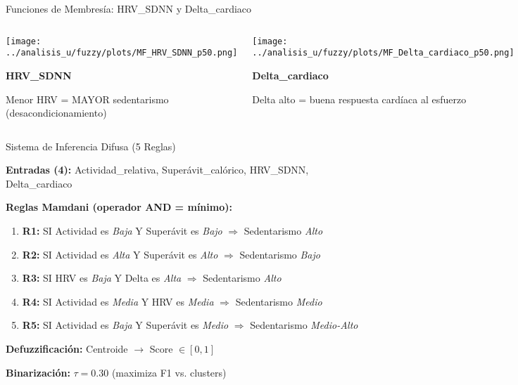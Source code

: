 \documentclass[aspectratio=169]{beamer}
\begin{document}
\begin{frame}{Funciones de Membresía: HRV\_SDNN y Delta\_cardiaco}

\begin{columns}[T]
\begin{center}
\texttt{[image: ../analisis\_u/fuzzy/plots/MF\_HRV\_SDNN\_p50.png]}

\textbf{HRV\_SDNN}

Menor HRV = MAYOR sedentarismo (desacondicionamiento)
\end{center}

\begin{center}
\texttt{[image: ../analisis\_u/fuzzy/plots/MF\_Delta\_cardiaco\_p50.png]}

\textbf{Delta\_cardiaco}

Delta alto = buena respuesta cardíaca al esfuerzo
\end{center}
\end{columns}

\end{frame}


\begin{frame}{Sistema de Inferencia Difusa (5 Reglas)}

\textbf{Entradas (4):} Actividad\_relativa, Superávit\_calórico, HRV\_SDNN, Delta\_cardiaco

\vspace{0.5cm}

\textbf{Reglas Mamdani (operador AND = mínimo):}

\begin{enumerate}
    \item \textbf{R1:} SI Actividad es \textit{Baja} Y Superávit es \textit{Bajo} $\Rightarrow$ Sedentarismo \textit{Alto}
    \item \textbf{R2:} SI Actividad es \textit{Alta} Y Superávit es \textit{Alto} $\Rightarrow$ Sedentarismo \textit{Bajo}
    \item \textbf{R3:} SI HRV es \textit{Baja} Y Delta es \textit{Alta} $\Rightarrow$ Sedentarismo \textit{Alto}
    \item \textbf{R4:} SI Actividad es \textit{Media} Y HRV es \textit{Media} $\Rightarrow$ Sedentarismo \textit{Medio}
    \item \textbf{R5:} SI Actividad es \textit{Baja} Y Superávit es \textit{Medio} $\Rightarrow$ Sedentarismo \textit{Medio-Alto}
\end{enumerate}

\vspace{0.3cm}

\textbf{Defuzzificación:} Centroide $\rightarrow$ Score $\in [0, 1]$

\textbf{Binarización:} $\tau = 0.30$ (maximiza F1 vs. clusters)

\end{frame}
\end{document}

